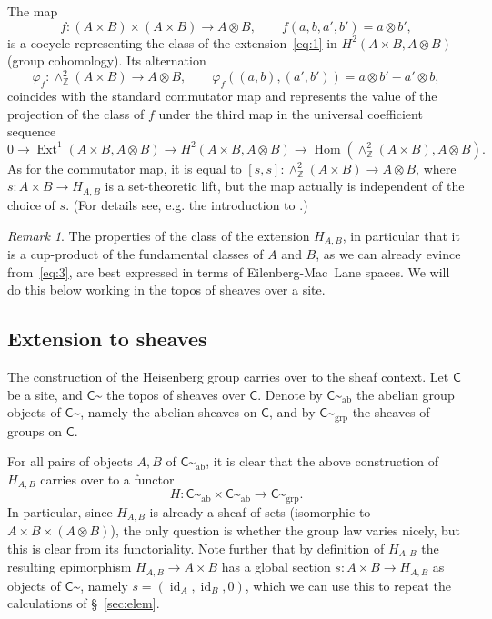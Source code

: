 \documentclass{amsart}
\numberwithin{equation}{subsection}
\theoremstyle{remark}
\newtheorem{remark}[theorem]{Remark}
\theoremstyle{remark}
\DeclareMathOperator{\id}{id}
\newcommand{\eg}{e.g.\xspace}
\newcommand{\too}{\longrightarrow}%
\newcommand{\bbZ}{\mathbb{Z}}
\newcommand{\C}{\mathsf{C}} %
\DeclareMathOperator{\Ext}{Ext}
\DeclareMathOperator{\Hom}{Hom}
\newcommand{\shC}{\C\sptilde} %
\newcommand{\shAbC}{\shC_\mathrm{ab}} %
\newcommand{\shGrpC}{\shC_\mathrm{grp}} %
\begin{document}
The map
\begin{equation}
  \label{eq:3}
  f \colon (A\times B)\times (A\times B) \too A\otimes B,
  \qquad
  f(a,b,a',b') = a\otimes b',
\end{equation}
is a cocycle representing the class of the extension~\eqref{eq:1} in $H^2(A\times B, A\otimes B)$ (group cohomology).  Its alternation
\begin{equation*}
  \varphi_f\colon \wedge_\bbZ^2 (A\times B) \too A\otimes B,
  \qquad
  \varphi_f((a,b),(a',b')) = a\otimes b' - a'\otimes b,
\end{equation*}
coincides with the standard commutator map and represents the value of the projection of the class of $f$ under the third map in the universal coefficient sequence
\begin{equation*}
  0 \too \Ext^1(A\times B, A\otimes B) \too
  H^2(A\times B, A\otimes B) \too
  \Hom(\wedge_\bbZ^2 (A\times B), A\otimes B).
\end{equation*}
As for the commutator map, it is equal to $[s,s]\colon \wedge_\bbZ^2 (A\times B)\to A\otimes B$, where $s\colon A\times B\to H_{A,B}$ is a set-theoretic lift, but the map actually is independent of the choice of $s$. (For details see, \eg the introduction to \cite{Breen99}.)
\begin{remark}
  The properties of the class of the extension $H_{A,B}$, in particular that it is a cup-product of the fundamental classes of $A$ and $B$, as we can already evince from~\eqref{eq:3}, are best expressed in terms of Eilenberg-Mac~Lane spaces. We will do this below working in the topos of sheaves over a site.
\end{remark}
\subsection{Extension to sheaves}
\label{sec:sh} 

The construction of the Heisenberg group carries over to the sheaf context. Let $\C$ be a site, and $\shC$ the topos of sheaves over $\C$. Denote by $\shAbC$ the abelian group objects of $\shC$, namely the abelian sheaves on $\C$, and by $\shGrpC$ the sheaves of groups on $\C$.

For all pairs of objects $A,B$ of $\shAbC$, it is clear that the above construction of $H_{A,B}$ carries over to a functor
\begin{equation*}
  H\colon \shAbC\times \shAbC \too \shGrpC.
\end{equation*}
In particular, since $H_{A,B}$ is already a sheaf of sets (isomorphic to $A \times B \times (A\otimes B)$), the only question is whether the group law varies nicely, but this is clear from its functoriality. Note further that by definition of $H_{A,B}$ the resulting epimorphism $H_{A,B}\to A\times B$ has a global section $s\colon A\times B\to H_{A,B}$ as objects of $\shC$, namely $s=(\id_A,\id_B,0)$, which we can use this to repeat the calculations of \S~\ref{sec:elem}.
\end{document}
